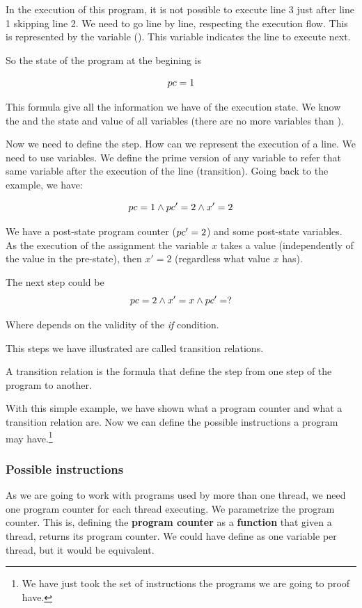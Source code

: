In the execution of this program, it is not possible to execute line 3 just after line 1 skipping line 2. We need to go line by line, respecting the execution flow. 
This is represented by the variable \pc (). This variable indicates the line to execute next.

So the state of the program at the begining is 

\[ pc = 1\]

This formula give all the information we have of the execution state. We know the \pc and the state and value of all variables (there are no more variables than \pc).

Now we need to define the step. 
%
How can we represent the execution of a line.
%
We need to use  variables. 
%
We define the prime version of any variable to refer that same variable after the execution of the line (transition). 
%
Going back to the example, we have:

\[
pc = 1 \wedge pc'=2 \wedge x'=2 
\]

We have a post-state program counter ($pc'=2$) and some post-state variables. 
%
As the execution of the assignment the variable $x$ takes a value (independently of the value in the pre-state), then $x'=2$ (regardless what value $x$ has). 

The next step could be
\[
pc = 2 \wedge x'=x \wedge 	pc'=?
\]

Where \? depends on the validity of the \textit{if} condition. 

This steps we have illustrated are called transition relations.

\begin{defn}
A transition relation is the formula that define the step from one step of the program to another.  
\end{defn}

With this simple example, we have shown what a program counter and what a transition relation are. Now we can define the possible instructions a program may have.\footnote{We have just took the set of instructions the programs we are going to proof have.}



\subsubsection{Possible instructions}
As we are going to work with programs used by more than one thread, we need one program counter for each thread executing. 
%
We parametrize the program counter. 
%
This is, defining the \textbf{program counter} as a \textbf{function} that given a thread, returns its program counter. 
%
We could have define as one variable per thread, but it would be equivalent. 

